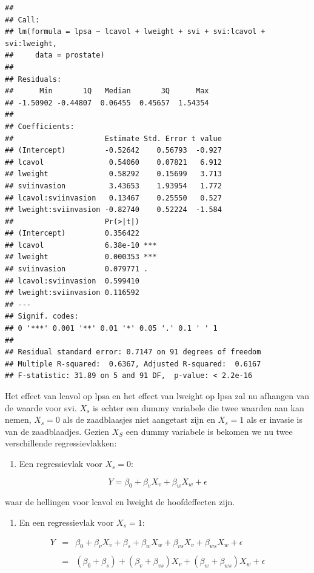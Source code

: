 \documentclass[
  12pt,dutch,coursenotes]{book}
\providecommand{\tightlist}{%
  \setlength{\itemsep}{0pt}\setlength{\parskip}{0pt}}
\begin{document}
\begin{lstlisting}
## 
## Call:
## lm(formula = lpsa ~ lcavol + lweight + svi + svi:lcavol + svi:lweight, 
##     data = prostate)
## 
## Residuals:
##      Min       1Q   Median       3Q      Max 
## -1.50902 -0.44807  0.06455  0.45657  1.54354 
## 
## Coefficients:
##                     Estimate Std. Error t value
## (Intercept)         -0.52642    0.56793  -0.927
## lcavol               0.54060    0.07821   6.912
## lweight              0.58292    0.15699   3.713
## sviinvasion          3.43653    1.93954   1.772
## lcavol:sviinvasion   0.13467    0.25550   0.527
## lweight:sviinvasion -0.82740    0.52224  -1.584
##                     Pr(>|t|)    
## (Intercept)         0.356422    
## lcavol              6.38e-10 ***
## lweight             0.000353 ***
## sviinvasion         0.079771 .  
## lcavol:sviinvasion  0.599410    
## lweight:sviinvasion 0.116592    
## ---
## Signif. codes:  
## 0 '***' 0.001 '**' 0.01 '*' 0.05 '.' 0.1 ' ' 1
## 
## Residual standard error: 0.7147 on 91 degrees of freedom
## Multiple R-squared:  0.6367, Adjusted R-squared:  0.6167 
## F-statistic: 31.89 on 5 and 91 DF,  p-value: < 2.2e-16
\end{lstlisting}

Het effect van lcavol op lpsa en het effect van lweight op lpsa zal nu afhangen van de waarde voor svi.
\(X_s\) is echter een dummy variabele die twee waarden aan kan nemen, \(X_s=0\) als de zaadblaasjes niet aangetast zijn en \(X_s=1\) als er invasie is van de zaadblaadjes.
Gezien \(X_S\) een dummy variabele is bekomen we nu twee verschillende regressievlakken:

\begin{enumerate}
\def\labelenumi{\arabic{enumi}.}
\tightlist
\item
  Een regressievlak voor \(X_s=0\):
\end{enumerate}

\[Y=\beta_0+\beta_vX_v+\beta_wX_w + \epsilon\]

waar de hellingen voor lcavol en lweight de hoofdeffecten zijn.

\begin{enumerate}
\def\labelenumi{\arabic{enumi}.}
\setcounter{enumi}{1}
\tightlist
\item
  En een regressievlak voor \(X_s=1\):
\end{enumerate}

\[
  \begin{array}{lcl}
  Y&=&\beta_0+\beta_vX_v+\beta_s+\beta_wX_w+\beta_{vs}X_v + \beta_{ws}X_w +\epsilon\\\\
  &=&(\beta_0+\beta_s)+(\beta_v+\beta_{vs})X_v+(\beta_w+\beta_{ws})X_w+\epsilon
  \end{array}
  \]
\end{document}

